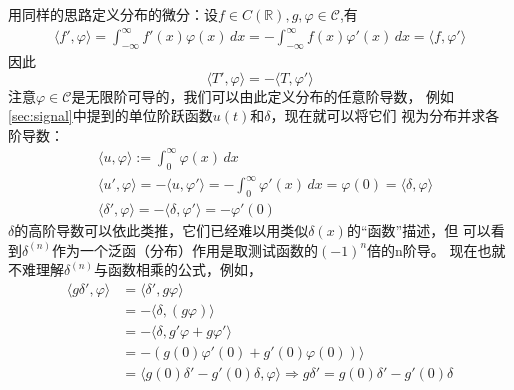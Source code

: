 \documentclass{ctexbook}
\begin{document}
用同样的思路定义分布的微分：设$f\in C(\mathbb{R}),g,\varphi\in\mathcal{C} $,有
\begin{align*}
    \langle f',\varphi\rangle=\int_{-\infty}^{\infty}f'(x)\varphi(x)\,dx=-\int_{-\infty}^{\infty}f(x)\varphi'(x)\,dx=\langle f,\varphi'\rangle
\end{align*}
因此
\begin{equation}
    \langle T',\varphi\rangle=-\langle T,\varphi'\rangle
\end{equation}
注意$\varphi\in\mathcal{C} $是无限阶可导的，我们可以由此定义分布的任意阶导数，
例如\ref{sec:signal}中提到的单位阶跃函数$u(t)$和$\delta$，现在就可以将它们
视为分布并求各阶导数：
\begin{align*}
     & \langle u,\varphi\rangle:=\int_{0}^{\infty}\varphi(x)\,dx                                                                      \\
     & \langle u',\varphi\rangle=-\langle u,\varphi'\rangle=-\int_{0}^{\infty}\varphi'(x)\,dx=\varphi(0)=\langle\delta,\varphi\rangle \\
     & \langle \delta',\varphi\rangle=-\langle \delta,\varphi'\rangle=-\varphi'(0)
\end{align*}
$\delta$的高阶导数可以依此类推，它们已经难以用类似$\delta(x)$的“函数”描述，但
可以看到$\delta^{(n)}$作为一个泛函（分布）作用是取测试函数的$(-1)^n$倍的n阶导。
现在也就不难理解$\delta^{(n)}$与函数相乘的公式，例如，
\begin{align*}
    \langle g\delta',\varphi\rangle & =\langle \delta',g\varphi\rangle                \\
                                    & =-\langle\delta,(g\varphi)\rangle               \\
                                    & =-\langle\delta,g'\varphi+g\varphi'\rangle      \\
                                    & =-(g(0)\varphi'(0)+g'(0)\varphi(0)) \rangle     \\
                                    & =\langle g(0)\delta'-g'(0)\delta,\varphi\rangle
    \Rightarrow g\delta'=g(0)\delta'-g'(0)\delta
\end{align*}
\end{document}
